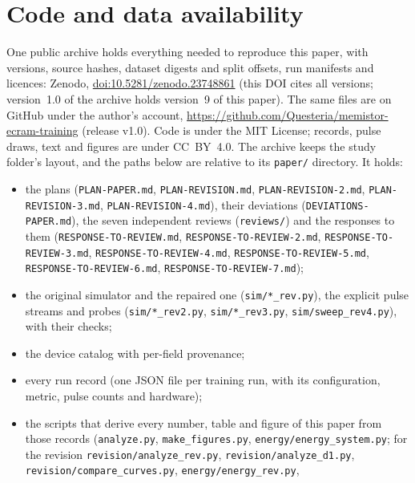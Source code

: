 








\section{Code and data availability}\label{sec:availability}
\begin{sloppypar}
One public archive holds everything needed to reproduce this paper, with versions, source hashes, dataset digests and split
offsets, run manifests and licences: Zenodo, \href{https://doi.org/10.5281/zenodo.23748861}{doi:10.5281/zenodo.23748861}
(this DOI cites all versions; version~1.0 of the archive holds version~9 of this paper). The same files are on GitHub under
the author's account, \url{https://github.com/Questeria/memistor-ecram-training} (release v1.0). Code is under the MIT License; records, pulse draws, text and
figures are under CC~BY~4.0. The archive keeps the study folder's layout, and the paths below are relative to its
\texttt{paper/} directory. It holds:
\begin{itemize}
\item the plans (\texttt{PLAN-PAPER.md}, \texttt{PLAN-REVISION.md}, \texttt{PLAN-REVISION-2.md},
      \texttt{PLAN-REVISION-3.md}, \texttt{PLAN-REVISION-4.md}), their deviations (\texttt{DEVIATIONS-PAPER.md}), the seven independent reviews
      (\texttt{reviews/}) and the responses to them (\texttt{RESPONSE-TO-REVIEW.md}, \texttt{RESPONSE-TO-REVIEW-2.md},
      \texttt{RESPONSE-TO-REVIEW-3.md}, \texttt{RESPONSE-TO-REVIEW-4.md}, \texttt{RESPONSE-TO-REVIEW-5.md}, \texttt{RESPONSE-TO-REVIEW-6.md}, \texttt{RESPONSE-TO-REVIEW-7.md});
\item the original simulator and the repaired one (\texttt{sim/*\_rev.py}), the explicit pulse streams and probes
      (\texttt{sim/*\_rev2.py}, \texttt{sim/*\_rev3.py}, \texttt{sim/sweep\_rev4.py}), with their checks;
\item the device catalog with per-field provenance;
\item every run record (one JSON file per training run, with its configuration, metric, pulse counts and hardware);
\item the scripts that derive every number, table and figure of this paper from those records (\texttt{analyze.py},
      \texttt{make\_figures.py}, \texttt{energy/energy\_system.py}; for the revision \texttt{revision/analyze\_rev.py},
      \texttt{revision/analyze\_d1.py}, \texttt{revision/compare\_curves.py}, \texttt{energy/energy\_rev.py},

\end{itemize}
\end{sloppypar}
